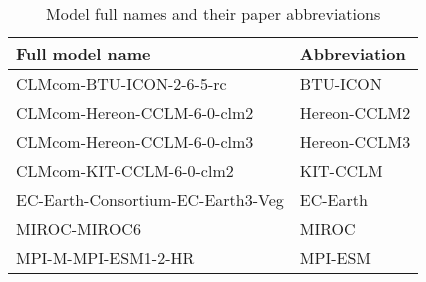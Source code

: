 \begin{table}[htbp]
  \centering
  \caption{Model full names and their paper abbreviations}
  \label{tab:model_abbrevs}
  \begin{tabular}{p{8cm}l}
    \toprule
    Full model name & Abbreviation \\
    \midrule
    CLMcom-BTU-ICON-2-6-5-rc & BTU-ICON \\
    CLMcom-Hereon-CCLM-6-0-clm2 & Hereon-CCLM2 \\
    CLMcom-Hereon-CCLM-6-0-clm3 & Hereon-CCLM3 \\
    CLMcom-KIT-CCLM-6-0-clm2 & KIT-CCLM \\
    EC-Earth-Consortium-EC-Earth3-Veg & EC-Earth \\
    MIROC-MIROC6 & MIROC \\
    MPI-M-MPI-ESM1-2-HR & MPI-ESM \\
    \bottomrule
  \end{tabular}
\end{table}
